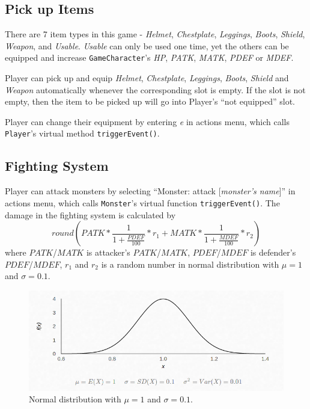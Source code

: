 \documentclass{article}
\begin{document}
    \subsection{Pick up Items}\label{subsection:pick}
    There are 7 item types in this game - \textit{Helmet}, \textit{Chestplate}, \textit{Leggings}, \textit{Boots}, \textit{Shield}, \textit{Weapon}, and \textit{Usable}. \textit{Usable} can only be used one time, yet the others can be equipped and increase \texttt{GameCharacter}'s \textit{HP}, \textit{PATK}, \textit{MATK}, \textit{PDEF} or \textit{MDEF}.
    \par
    Player can pick up and equip \textit{Helmet}, \textit{Chestplate}, \textit{Leggings}, \textit{Boots}, \textit{Shield} and \textit{Weapon} automatically whenever the corresponding slot is empty. If the slot is not empty, then the item to be picked up will go into  Player's ``not equipped'' slot.
    \par
    Player can change their equipment by entering \textit{e} in actions menu, which calls \texttt{Player}'s virtual method \texttt{triggerEvent()}.
    
    \subsection{Fighting System}\label{subsection:fighting}
    Player can attack monsters by selecting ``Monster: attack [\textit{monster's name}]'' in actions menu, which calls \texttt{Monster}'s virtual function \texttt{triggerEvent()}. The damage in the fighting system is calculated by
    \[
    round(PATK*\frac{1}{1+\frac{PDEF}{100}}*r_1+MATK*\frac{1}{1+\frac{MDEF}{100}}*r_2)
    \]
    where $PATK$/$MATK$ is attacker's $PATK$/$MATK$, $PDEF$/$MDEF$ is defender's $PDEF$/$MDEF$, $r_1$ and $r_2$ is a random number in normal distribution with $\mu = 1$ and $\sigma = 0.1$.
    \begin{figure}[h]
        \centering
        \includegraphics[width=0.5\linewidth]{normal_distribution}
        \caption{Normal distribution with $\mu = 1$ and $\sigma = 0.1$.}
    \end{figure}
    
    
\end{document}
